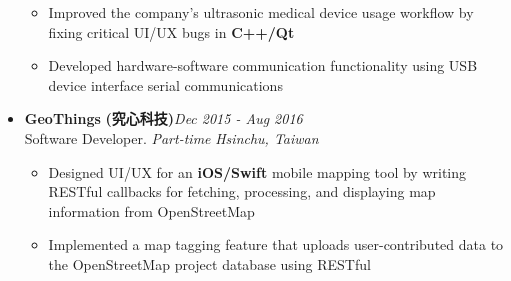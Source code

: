 \begin{itemize}[leftmargin=0pt, label={}]
{    \vspace{-6pt}
    \begin{itemize}[label=\textbullet, leftmargin=*, noitemsep]%
        \item{Improved the company's ultrasonic medical device usage workflow by fixing critical UI/UX bugs in \textbf{C++/Qt}}
        \item{Developed hardware-software communication functionality using USB device interface serial communications}
    \end{itemize}
}

\item{
{\sectionheading\large{\textbf{GeoThings}}} \textbf{(究心科技)}\hfill {\sectionheading\small{\textit{Dec 2015 - Aug 2016}}}\\
{\sectionheading\small{Software Developer. \textit{Part-time}}}\hfill
{\sectionheading\small{\textit{Hsinchu, Taiwan}}}

    \vspace{-6pt}
    \begin{itemize}[label=\textbullet, leftmargin=*, noitemsep]%
        \item{Designed UI/UX for an \textbf{iOS/Swift} mobile mapping tool by writing RESTful callbacks for fetching, processing, and displaying map information from OpenStreetMap}
        \item{Implemented a map tagging feature that uploads user-contributed data to the OpenStreetMap project database using RESTful}
    \end{itemize}
}
\end{itemize}

